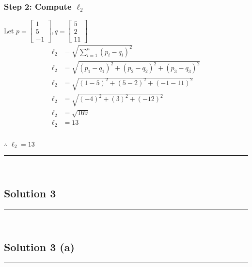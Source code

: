 \documentclass{article}
\begin{document}
\subsubsection*{Step 2: Compute $\ell_2$}
\parbox{\textwidth}{
Let $p = \begin{bmatrix} 1 \\ 5 \\ -1 \end{bmatrix}, q = \begin{bmatrix} 5 \\ 2 \\ 11 \end{bmatrix}$
$$
\begin{aligned}
\ell_2 &= \sqrt{\sum_{i=1}^{n} (p_i - q_i)^2}\\
\ell_2 &= \sqrt{(p_1 - q_1)^{2}+(p_2 - q_2)^{2}+(p_3 - q_3)^{2}}\\
\ell_2 &= \sqrt{(1 - 5)^{2}+(5 - 2)^{2}+(-1 - 11)^{2}}\\
\ell_2 &= \sqrt{(-4)^{2}+(3)^{2}+(-12)^{2}}\\
\ell_2 &= \sqrt{169}\\
\ell_2 &= 13
\end{aligned}
$$
}
\subsubsection*{\normalfont}{$\therefore$ $\ell_{2} = 13$}

\noindent\rule{\textwidth}{0.4pt}\\

\newpage

\subsection*{Solution 3}
\noindent\rule{\textwidth}{0.4pt}\\
\subsection*{Solution 3 (a)}
\noindent\rule{\textwidth}{0.4pt}\\
\end{document}
